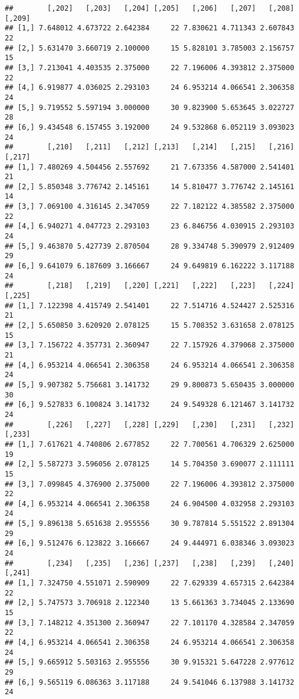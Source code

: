 \documentclass[]{article}
\begin{document}
\begin{verbatim}
##        [,202]   [,203]   [,204] [,205]   [,206]   [,207]   [,208] [,209]
## [1,] 7.648012 4.673722 2.642384     22 7.830621 4.711343 2.607843     22
## [2,] 5.631470 3.660719 2.100000     15 5.828101 3.785003 2.156757     15
## [3,] 7.213041 4.403535 2.375000     22 7.196006 4.393812 2.375000     22
## [4,] 6.919877 4.036025 2.293103     24 6.953214 4.066541 2.306358     24
## [5,] 9.719552 5.597194 3.000000     30 9.823900 5.653645 3.022727     28
## [6,] 9.434548 6.157455 3.192000     24 9.532868 6.052119 3.093023     24
##        [,210]   [,211]   [,212] [,213]   [,214]   [,215]   [,216] [,217]
## [1,] 7.480269 4.504456 2.557692     21 7.673356 4.587000 2.541401     21
## [2,] 5.850348 3.776742 2.145161     14 5.810477 3.776742 2.145161     14
## [3,] 7.069100 4.316145 2.347059     22 7.182122 4.385582 2.375000     22
## [4,] 6.940271 4.047723 2.293103     23 6.846756 4.030915 2.293103     24
## [5,] 9.463870 5.427739 2.870504     28 9.334748 5.390979 2.912409     29
## [6,] 9.641079 6.187609 3.166667     24 9.649819 6.162222 3.117188     24
##        [,218]   [,219]   [,220] [,221]   [,222]   [,223]   [,224] [,225]
## [1,] 7.122398 4.415749 2.541401     22 7.514716 4.524427 2.525316     21
## [2,] 5.650850 3.620920 2.078125     15 5.708352 3.631658 2.078125     15
## [3,] 7.156722 4.357731 2.360947     22 7.157926 4.379068 2.375000     21
## [4,] 6.953214 4.066541 2.306358     24 6.953214 4.066541 2.306358     24
## [5,] 9.907382 5.756681 3.141732     29 9.800873 5.650435 3.000000     30
## [6,] 9.527833 6.100824 3.141732     24 9.549328 6.121467 3.141732     24
##        [,226]   [,227]   [,228] [,229]   [,230]   [,231]   [,232] [,233]
## [1,] 7.617621 4.740806 2.677852     22 7.700561 4.706329 2.625000     19
## [2,] 5.587273 3.596056 2.078125     14 5.704350 3.690077 2.111111     15
## [3,] 7.099845 4.376900 2.375000     22 7.196006 4.393812 2.375000     22
## [4,] 6.953214 4.066541 2.306358     24 6.904500 4.032958 2.293103     24
## [5,] 9.896138 5.651638 2.955556     30 9.787814 5.551522 2.891304     29
## [6,] 9.512476 6.123822 3.166667     24 9.444971 6.038346 3.093023     24
##        [,234]   [,235]   [,236] [,237]   [,238]   [,239]   [,240] [,241]
## [1,] 7.324750 4.551071 2.590909     22 7.629339 4.657315 2.642384     22
## [2,] 5.747573 3.706918 2.122340     13 5.661363 3.734045 2.133690     15
## [3,] 7.148212 4.351300 2.360947     22 7.101170 4.328584 2.347059     22
## [4,] 6.953214 4.066541 2.306358     24 6.953214 4.066541 2.306358     24
## [5,] 9.665912 5.503163 2.955556     30 9.915321 5.647228 2.977612     29
## [6,] 9.565119 6.086363 3.117188     24 9.541046 6.137988 3.141732     24

\end{verbatim}
\end{document}
